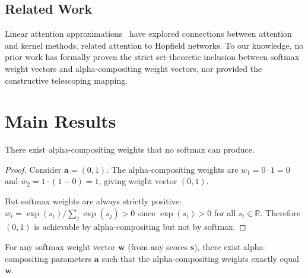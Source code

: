 \documentclass[twoside,11pt]{article}
\begin{document}
\subsection{Related Work}

Linear attention approximations~\citep{katharopoulos2020} have explored connections between attention and kernel methods. \citet{ramsauer2021} related attention to Hopfield networks. To our knowledge, no prior work has formally proven the strict set-theoretic inclusion between softmax weight vectors and alpha-compositing weight vectors, nor provided the constructive telescoping mapping.

\section{Main Results}

\begin{theorem}
\label{thm:alpha-not-subset}
There exist alpha-compositing weights that no softmax can produce.
\end{theorem}

\begin{proof}
Consider $\mathbf{a} = (0, 1)$. The alpha-compositing weights are $w_1 = 0 \cdot 1 = 0$ and $w_2 = 1 \cdot (1 - 0) = 1$, giving weight vector $(0, 1)$.

But softmax weights are always strictly positive: $w_i = \exp(s_i)/\sum_j\exp(s_j) > 0$ since $\exp(s_i) > 0$ for all $s_i \in \mathbb{R}$. Therefore $(0,1)$ is achievable by alpha-compositing but not by softmax.
\end{proof}

\begin{theorem}
\label{thm:softmax-subset}
For any softmax weight vector $\mathbf{w}$ (from any scores $\mathbf{s}$), there exist alpha-compositing parameters $\mathbf{a}$ such that the alpha-compositing weights exactly equal $\mathbf{w}$.
\end{theorem}
\end{document}
